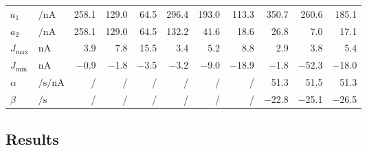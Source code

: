 \begin{table}[h!]
\begin{tabular}{l l   r r r   r r r   r r r}
		$a_1$ & $\si{\per\nano\ampere}$ &
		\num{258.1} & \num{129.0} & \num{64.5} &
		\num{296.4} & \num{193.0} & \num{113.3} &
		\num{350.7} & \num{260.6} & \num{185.1} \\

		$a_2$ & $\si{\per\nano\ampere}$ &
		\num{258.1} & \num{129.0} & \num{64.5} &
		\num{132.2} & \num{41.6} & \num{18.6} &
		\num{26.8} & \num{7.0} & \num{17.1} \\[2.5mm]

	
		$J_\mathrm{max}$ & $\si{\nano\ampere}$ &
		\num{3.9} & \num{7.8} & \num{15.5} &
		\num{3.4} & \num{5.2} & \num{8.8} &
		\num{2.9} & \num{3.8} & \num{5.4} \\

		$J_\mathrm{min}$ & $\si{\nano\ampere}$ &
		\num{-0.9} & \num{-1.8} & \num{-3.5} &
		\num{-3.2} & \num{-9.0} & \num{-18.9} &
		\num{-1.8} &\num{-52.3} & \num{-18.0} \\[2.5mm]

		$\alpha$ & $\si{\per\second\per\nano\ampere}$ &
		/&/&/&/&/&/&
		\num{51.3} & \num{51.5} & \num{51.3}
		\\
		$\beta$ & $\si{\per\second}$ &
		/&/&/&/&/&/&
		\num{-22.8} & \num{-25.1} & \num{-26.5}\\
		\bottomrule
	\end{tabular}
	\label{tbl:two_comp_model_parameters}
\end{table}

\subsection{Results}
\label{app:two_comp_lif_results}

